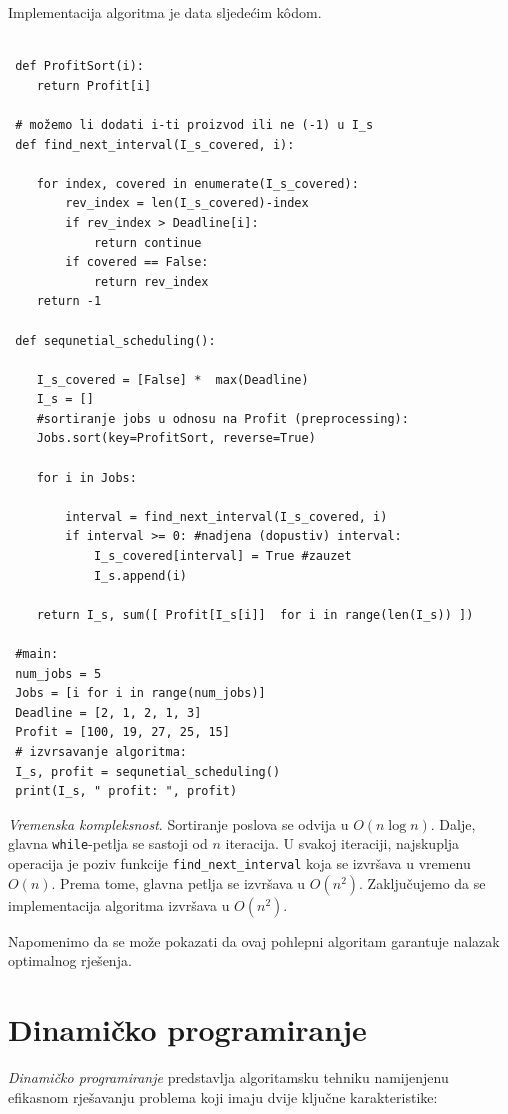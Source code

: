 Implementacija algoritma je data sljedećim k\^odom. 
 
 \begin{verbatim}
 
 def ProfitSort(i):
 	return Profit[i]
 
 # možemo li dodati i-ti proizvod ili ne (-1) u I_s
 def find_next_interval(I_s_covered, i):
 
 	for index, covered in enumerate(I_s_covered):
 	    rev_index = len(I_s_covered)-index
 		if rev_index > Deadline[i]:
 			return continue
 		if covered == False:
 			return rev_index
 	return -1       
 
 def sequnetial_scheduling():
 
 	I_s_covered = [False] *  max(Deadline) 
 	I_s = []
 	#sortiranje jobs u odnosu na Profit (preprocessing):
 	Jobs.sort(key=ProfitSort, reverse=True)

 	for i in Jobs:
 
 		interval = find_next_interval(I_s_covered, i)
 		if interval >= 0: #nadjena (dopustiv) interval:
 			I_s_covered[interval] = True #zauzet
 			I_s.append(i)
 
 	return I_s, sum([ Profit[I_s[i]]  for i in range(len(I_s)) ])
 
 #main:
 num_jobs = 5
 Jobs = [i for i in range(num_jobs)]
 Deadline = [2, 1, 2, 1, 3]
 Profit = [100, 19, 27, 25, 15]
 # izvrsavanje algoritma:
 I_s, profit = sequnetial_scheduling()
 print(I_s, " profit: ", profit)
 \end{verbatim}

\textit{Vremenska kompleksnost}. Sortiranje poslova se odvija u $O(n \log n)$. Dalje, glavna \texttt{while}-petlja se sastoji od $n$ iteracija. U svakoj iteraciji, najskuplja operacija je poziv funkcije \texttt{find\_next\_interval} koja se izvršava u vremenu $O(n)$. Prema tome,   glavna petlja se izvršava u $O(n^2)$. Zaključujemo da se implementacija algoritma izvršava u $O(n^2)$. 

Napomenimo da se može pokazati da ovaj pohlepni algoritam garantuje nalazak optimalnog rješenja.

\section{Dinamičko programiranje}

\textit{Dinamičko programiranje} predstavlja algoritamsku tehniku namijenjenu efikasnom rješavanju problema koji imaju dvije ključne karakteristike:

